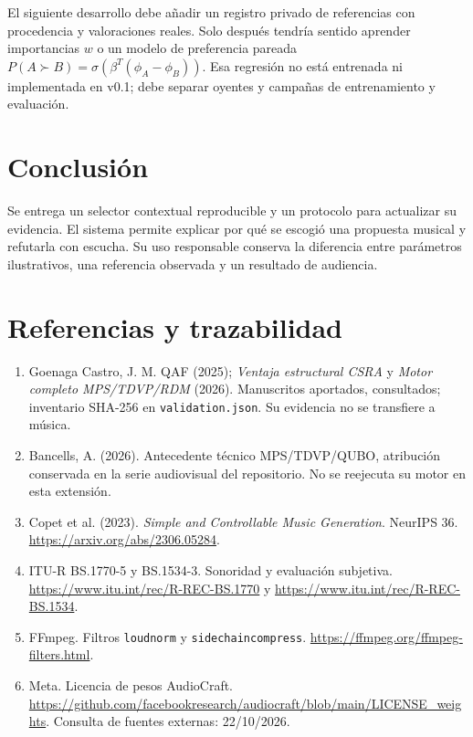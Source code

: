 \documentclass[11pt,a4paper]{article}
\begin{document}
El siguiente desarrollo debe añadir un registro privado de referencias con procedencia y valoraciones reales. Solo después tendría sentido aprender importancias $w$ o un modelo de preferencia pareada $P(A\succ B)=\sigma(\beta^T(\phi_A-\phi_B))$. Esa regresión no está entrenada ni implementada en v0.1; debe separar oyentes y campañas de entrenamiento y evaluación.

\section{Conclusión}
Se entrega un selector contextual reproducible y un protocolo para actualizar su evidencia. El sistema permite explicar por qué se escogió una propuesta musical y refutarla con escucha. Su uso responsable conserva la diferencia entre parámetros ilustrativos, una referencia observada y un resultado de audiencia.
\section*{Referencias y trazabilidad}
\begin{enumerate}\small
\item Goenaga Castro, J. M. QAF (2025); \emph{Ventaja estructural CSRA} y \emph{Motor completo MPS/TDVP/RDM} (2026). Manuscritos aportados, consultados; inventario SHA-256 en \texttt{validation.json}. Su evidencia no se transfiere a música.
\item Bancells, A. (2026). Antecedente técnico MPS/TDVP/QUBO, atribución conservada en la serie audiovisual del repositorio. No se reejecuta su motor en esta extensión.
\item Copet et al. (2023). \emph{Simple and Controllable Music Generation}. NeurIPS 36. \url{https://arxiv.org/abs/2306.05284}.
\item ITU-R BS.1770-5 y BS.1534-3. Sonoridad y evaluación subjetiva. \url{https://www.itu.int/rec/R-REC-BS.1770} y \url{https://www.itu.int/rec/R-REC-BS.1534}.
\item FFmpeg. Filtros \texttt{loudnorm} y \texttt{sidechaincompress}. \url{https://ffmpeg.org/ffmpeg-filters.html}.
\item Meta. Licencia de pesos AudioCraft. \url{https://github.com/facebookresearch/audiocraft/blob/main/LICENSE_weights}. Consulta de fuentes externas: 22/10/2026.
\end{enumerate}
\end{document}
